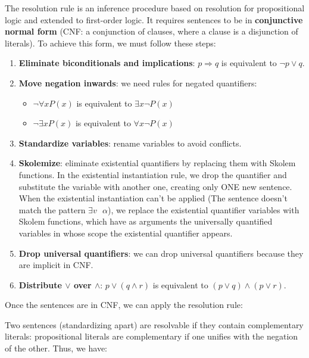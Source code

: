 \documentclass[12pt]{article}
\begin{document}
\begin{enumerate}[label=\textbf{FOL.\arabic*}]
          The resolution rule is an inference procedure based on resolution for propositional logic and extended to first-order logic. It requires sentences to be in \textbf{conjunctive normal form} (CNF: a conjunction of clauses, where a clause is a disjunction of literals). To achieve this form, we must follow these steps:

          \begin{enumerate}
              \item \textbf{Eliminate biconditionals and implications}: $p\Rightarrow q$ is equivalent to $\lnot p\lor q$.
              \item \textbf{Move negation inwards}: we need rules for negated quantifiers:
                    \begin{itemize}
                        \item $\lnot\forall x P(x)$ is equivalent to $\exists x \lnot P(x)$
                        \item $\lnot\exists x P(x)$ is equivalent to $\forall x \lnot P(x)$
                    \end{itemize}
              \item \textbf{Standardize variables}: rename variables to avoid conflicts.
              \item \textbf{Skolemize}: eliminate existential quantifiers by replacing them with Skolem functions. In the existential instantiation rule, we drop the quantifier and substitute the variable with another one, creating only ONE new sentence. When the existential instantiation can't be applied (The sentence doesn't match the pattern $\exists v\text{ }\alpha$), we replace the existential quantifier variables with Skolem functions, which have as arguments the universally quantified variables in whose scope the existential quantifier appears.
              \item \textbf{Drop universal quantifiers}: we can drop universal quantifiers because they are implicit in CNF.
              \item \textbf{Distribute $\lor$ over $\land$}: $p\lor(q\land r)$ is equivalent to $(p\lor q)\land(p\lor r)$.
          \end{enumerate}

          Once the sentences are in CNF, we can apply the resolution rule:

          Two sentences (standardizing apart) are resolvable if they contain complementary literals: propositional literals are complementary if one unifies with the negation of the other. Thus, we have:


\end{enumerate}
\end{document}
